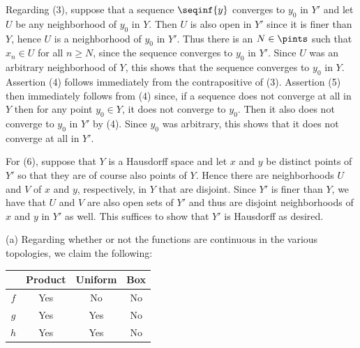 {{    Regarding (3), suppose that a sequence $\seqinf{y}$ converges to $y_0$ in $Y'$ and let $U$ be any neighborhood of $y_0$ in $Y$.
    Then $U$ is also open in $Y'$ since it is finer than $Y$, hence $U$ is a neighborhood of $y_0$ in $Y'$.
    Thus there is an $N \in \pints$ such that $x_n \in U$ for all $n \geq N$, since the sequence converges to $y_0$ in $Y'$.
    Since $U$ was an arbitrary neighborhood of $Y$, this shows that the sequence converges to $y_0$ in $Y$.
    Assertion (4) follows immediately from the contrapositive of (3).
    Assertion (5) then immediately follows from (4) since, if a sequence does not converge at all in $Y$ then for any point $y_0 \in Y$, it does not converge to $y_0$.
    Then it also does not converge to $y_0$ in $Y'$ by (4).
    Since $y_0$ was arbitrary, this shows that it does not converge at all in $Y'$.

    For (6), suppose that $Y$ is a Hausdorff space and let $x$ and $y$ be distinct points of $Y'$ so that they are of course also points of $Y$.
    Hence there are neighborhoods $U$ and $V$ of $x$ and $y$, respectively, in $Y$ that are disjoint.
    Since $Y'$ is finer than $Y$, we have that $U$ and $V$ are also open sets of $Y'$ and thus are disjoint neighborhoods of $x$ and $y$ in $Y'$ as well.
    This suffices to show that $Y'$ is Hausdorff as desired.
  }

  \mainprob
  
  (a) Regarding whether or not the functions are continuous in the various topologies, we claim the following:
  \begin{center}
    \begin{tabular}{c|ccc}
      & Product & Uniform & Box \\
      \hline
      $f$ & Yes & No & No \\
      $g$ & Yes & Yes & No \\
      $h$ & Yes & Yes & No
    \end{tabular}
  \end{center}

  }
